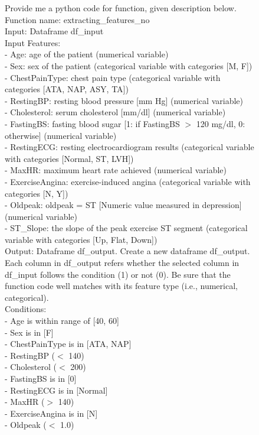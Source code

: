 \documentclass{article}
\theoremstyle{plain}
\theoremstyle{definition}
\theoremstyle{remark}
\begin{document}
\begin{figure}[ht!]
\begin{tcolorbox}[enhanced,attach boxed title to top center={yshift=-3mm,yshifttext=-1mm},
  colback=black!0!white, colframe=black!20!white, colbacktitle=black!10!white, coltitle=blue!20!black ]
\footnotesize{
Provide me a python code for function, given description below. \\

Function name: extracting\_features\_no \\

Input: Dataframe df\_input \\

Input Features: \\
- Age: age of the patient (numerical variable)\\
- Sex: sex of the patient (categorical variable with categories [M, F])\\
- ChestPainType: chest pain type (categorical variable with categories [ATA, NAP, ASY, TA])\\
- RestingBP: resting blood pressure [mm Hg] (numerical variable)\\
- Cholesterol: serum cholesterol [mm/dl] (numerical variable)\\
- FastingBS: fasting blood sugar [1: if FastingBS $>$ 120 mg/dl, 0: otherwise] (numerical variable)\\
- RestingECG: resting electrocardiogram results (categorical variable with categories [Normal, ST, LVH])\\
- MaxHR: maximum heart rate achieved (numerical variable)\\
- ExerciseAngina: exercise-induced angina (categorical variable with categories [N, Y])\\
- Oldpeak: oldpeak = ST [Numeric value measured in depression] (numerical variable)\\
- ST\_Slope: the slope of the peak exercise ST segment (categorical variable with categories [Up, Flat, Down])\\

Output: Dataframe df\_output. Create a new dataframe df\_output. Each column in df\_output refers whether the selected column in df\_input follows the condition (1) or not (0). Be sure that the function code well matches with its feature type (i.e., numerical, categorical). \\

Conditions: \\
- Age is within range of [40, 60] \\
- Sex is in [F] \\
- ChestPainType is in [ATA, NAP] \\
- RestingBP ($<$ 140) \\
- Cholesterol ($<$ 200) \\
- FastingBS is in [0] \\
- RestingECG is in [Normal] \\
- MaxHR ($>$ 140) \\
- ExerciseAngina is in [N] \\
- Oldpeak ($<$ 1.0) \\

}
\end{tcolorbox}
\end{figure}
\end{document}
